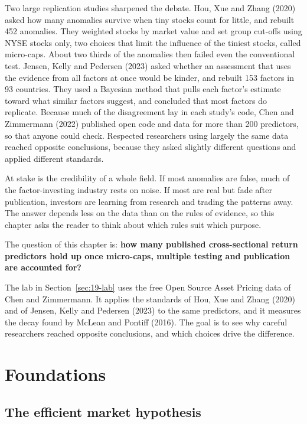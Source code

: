 Two large replication studies sharpened the debate. Hou, Xue and Zhang (2020) asked how many anomalies survive when tiny stocks count for little, and rebuilt 452 anomalies. They weighted stocks by market value and set group cut-offs using NYSE stocks only, two choices that limit the influence of the tiniest stocks, called micro-caps. About two thirds of the anomalies then failed even the conventional test. Jensen, Kelly and Pedersen (2023) asked whether an assessment that uses the evidence from all factors at once would be kinder, and rebuilt 153 factors in 93 countries. They used a Bayesian method that pulls each factor's estimate toward what similar factors suggest, and concluded that most factors do replicate. Because much of the disagreement lay in each study's code, Chen and Zimmermann (2022) published open code and data for more than 200 predictors, so that anyone could check. Respected researchers using largely the same data reached opposite conclusions, because they asked slightly different questions and applied different standards.

At stake is the credibility of a whole field. If most anomalies are false, much of the factor-investing industry rests on noise. If most are real but fade after publication, investors are learning from research and trading the patterns away. The answer depends less on the data than on the rules of evidence, so this chapter asks the reader to think about which rules suit which purpose. 

The question of this chapter is: \textbf{how many published cross-sectional return predictors hold up once micro-caps, multiple testing and publication are accounted for?}

The lab in Section~\ref{sec:19-lab} uses the free Open Source Asset Pricing data of Chen and Zimmermann. It applies the standards of Hou, Xue and Zhang (2020) and of Jensen, Kelly and Pedersen (2023) to the same predictors, and it measures the decay found by McLean and Pontiff (2016). The goal is to see why careful researchers reached opposite conclusions, and which choices drive the difference.


\section{Foundations}
\label{sec:19-foundations}

\subsection{The efficient market hypothesis}


